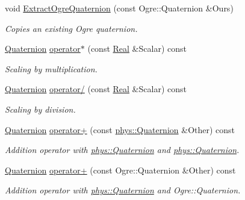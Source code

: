\begin{DoxyCompactItemize}
void \hyperlink{classphys_1_1Quaternion_a942fab675a0b124e1dc5e2febab113e6}{ExtractOgreQuaternion} (const Ogre::Quaternion \&Ours)
\begin{DoxyCompactList}\small\item\em Copies an existing Ogre quaternion. \item\end{DoxyCompactList}\item 
\hyperlink{classphys_1_1Quaternion}{Quaternion} \hyperlink{classphys_1_1Quaternion_a8a67c3e05a56a38407f899020c61631d}{operator$\ast$} (const \hyperlink{namespacephys_af7eb897198d265b8e868f45240230d5f}{Real} \&Scalar) const 
\begin{DoxyCompactList}\small\item\em Scaling by multiplication. \item\end{DoxyCompactList}\item 
\hyperlink{classphys_1_1Quaternion}{Quaternion} \hyperlink{classphys_1_1Quaternion_a9b9492e5a14178aedc784e93b0153364}{operator/} (const \hyperlink{namespacephys_af7eb897198d265b8e868f45240230d5f}{Real} \&Scalar) const 
\begin{DoxyCompactList}\small\item\em Scaling by division. \item\end{DoxyCompactList}\item 
\hyperlink{classphys_1_1Quaternion}{Quaternion} \hyperlink{classphys_1_1Quaternion_af3f9a9b5835400dc5b83ba06bf9845b0}{operator+} (const \hyperlink{classphys_1_1Quaternion}{phys::Quaternion} \&Other) const 
\begin{DoxyCompactList}\small\item\em Addition operator with \hyperlink{classphys_1_1Quaternion}{phys::Quaternion} and \hyperlink{classphys_1_1Quaternion}{phys::Quaternion}. \item\end{DoxyCompactList}\item 
\hyperlink{classphys_1_1Quaternion}{Quaternion} \hyperlink{classphys_1_1Quaternion_a71fcb37dae7602349e856b202ca00e89}{operator+} (const Ogre::Quaternion \&Other) const 
\begin{DoxyCompactList}\small\item\em Addition operator with \hyperlink{classphys_1_1Quaternion}{phys::Quaternion} and Ogre::Quaternion. \item\end{DoxyCompactList}\item 

\end{DoxyCompactItemize}
